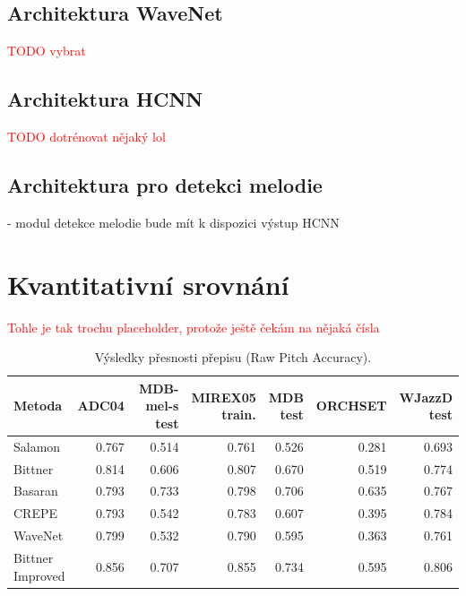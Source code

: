 \subsection{Architektura WaveNet}

\textcolor{red}{TODO vybrat}

\subsection{Architektura HCNN}

\textcolor{red}{TODO dotrénovat nějaký lol}

\subsection{Architektura pro detekci melodie}

- modul detekce melodie bude mít k dispozici výstup HCNN

\section{Kvantitativní srovnání}

\textcolor{red}{Tohle je tak trochu placeholder, protože ještě čekám na nějaká čísla}

\begin{table}[h!]
\centering

\begin{tabular}{lrrrrrr}
\toprule
              Metoda & ADC04 & \shortstack[r]{MDB-mel-s \\ test} & \shortstack[r]{MIREX05\\train.} & \shortstack[r]{MDB\\test} & ORCHSET & \shortstack[r]{WJazzD\\test} \\
\midrule
        Salamon & 0.767 &                 0.514 &          0.761 &         0.526 &   0.281 &       0.693 \\
        Bittner & 0.814 &                 0.606 &          0.807 &         0.670 &   0.519 &       0.774 \\
        Basaran & 0.793 &                 0.733 &          0.798 &         0.706 &   0.635 &       0.767 \\
          CREPE & 0.793 &                 0.542 &          0.783 &         0.607 &   0.395 &       0.784 \\
        WaveNet & 0.799 &                 0.532 &          0.790 &         0.595 &   0.363 &       0.761 \\
  \shortstack[r]{Bittner\\Improved} & 0.856 &                 0.707 &          0.855 &         0.734 &   0.595 &       0.806 \\
\bottomrule
\end{tabular}

\caption{Výsledky přesnosti přepisu (Raw Pitch Accuracy).}\label{tab:vysledky_RPA}
\end{table}

